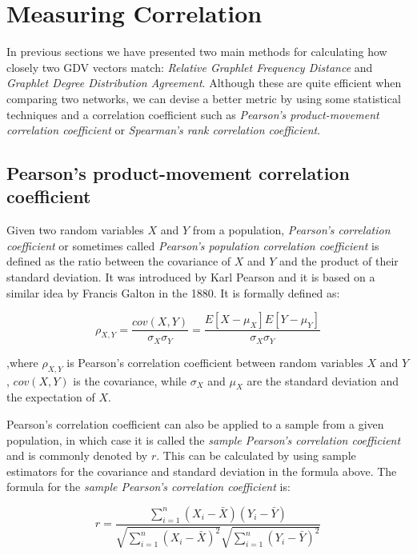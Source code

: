 \section{Measuring Correlation}

In previous sections we have presented two main methods for calculating
how closely two GDV vectors match: \emph{Relative Graphlet Frequency Distance}
 and \emph{Graphlet Degree Distribution Agreement}. Although these are quite
efficient when comparing two networks, we can devise a better metric by using
some statistical techniques and a correlation coefficient such as \emph{Pearson's
product-movement correlation coefficient} or \emph{Spearman's rank correlation
coefficient}.

\subsection{Pearson's product-movement correlation coefficient}

Given two random variables $X$ and $Y$ from a population, \emph{Pearson's
correlation coefficient} or sometimes called \emph{Pearson's population
correlation coefficient} is defined as the ratio between the covariance of $X$
and $Y$ and the product of their standard deviation. It was introduced by Karl
Pearson and it is based on a similar idea by Francis Galton in the
1880\cite{stigler1989francis}\cite{lee1988thirteen}. It is formally defined as:

$$ \rho_{X,Y} = \frac{cov(X,Y)}{\sigma_X\sigma_Y} =
\frac{E[X-\mu_X]E[Y-\mu_Y]}{\sigma_X\sigma_Y}$$

,where $ \rho_{X,Y} $ is Pearson's correlation coefficient between random
variables $X$ and $Y$, $ cov(X,Y) $ is the covariance, while $\sigma_X $ and $ \mu_X
$ are the standard deviation and the expectation of $X$.

Pearson's correlation coefficient can also be applied to a sample from a given
population, in which case it is called the \emph{sample Pearson's correlation
coefficient} and is commonly denoted by $r$. This can be calculated by using
sample estimators for the covariance and standard deviation in the formula
above. The formula for the \emph{sample Pearson's correlation
coefficient} is:

\begin{equation}
\label{pears_corr}
 r = \frac{\sum_{i=1}^{n}(X_i - \bar{X})(Y_i -
\bar{Y})}{\sqrt{\sum_{i=1}^{n}\left(X_i -
\bar{X}\right)^2}\sqrt{\sum_{i=1}^{n}\left(Y_i -
\bar{Y}\right)^2}} 
\end{equation}

